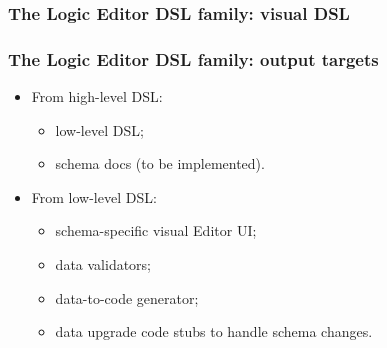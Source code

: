 \documentclass[handout]{beamer}
\begin{document}

\begin{frame}

\frametitle{The Logic Editor DSL family: visual DSL}

\begin{center}
\end{center}

\end{frame}


\begin{frame}

\frametitle{The Logic Editor DSL family: output targets}

\begin{itemize}
\item From high-level DSL:
  \begin{itemize}
  \item low-level DSL;
  \item schema docs (to be implemented).
  \end{itemize}
\item From low-level DSL:
  \begin{itemize}
  \item schema-specific visual Editor UI;
  \item data validators;
  \item data-to-code generator;
  \item data upgrade code stubs to handle schema changes.
  \end{itemize}
\end{itemize}

\end{frame}
\end{document}

